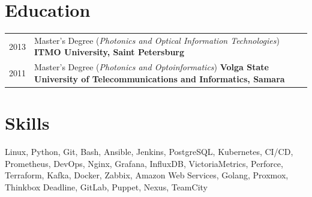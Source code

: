 \documentclass[a4paper,12pt]{article}
\begin{document}
\section{Education}
\begin{tabularx}{\linewidth}{@{}l X@{}}	
2013 & Master's Degree (\textit{Photonics and Optical Information Technologies}) \hfill \textbf{ITMO University, Saint Petersburg}  \\
2011 & Master's Degree (\textit{Photonics and Optoinformatics}) \hfill \textbf{Volga State University of Telecommunications and Informatics, Samara} \\ 
\end{tabularx}

\section{Skills}
{\raggedright
\normalsize Linux, Python, Git, Bash, Ansible, Jenkins, PostgreSQL, Kubernetes, CI/CD, Prometheus, DevOps, Nginx, Grafana, InfluxDB, VictoriaMetrics, Perforce, Terraform, Kafka, Docker, Zabbix, Amazon Web Services, Golang, Proxmox, Thinkbox Deadline, GitLab, Puppet, Nexus, TeamCity\par}

\vfill
{}
\end{document}
